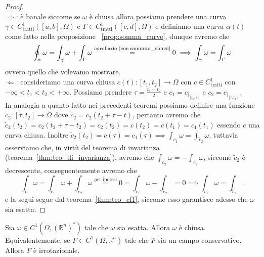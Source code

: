 \begin{proof} \hspace{1cm} \\
	$\boxed{\Rightarrow}$: è banale siccome se $\omega$ è chiusa allora possiamo prendere una curva $\gamma \in C^1_\text{tratti}([a, b], \Omega)$ e $\Gamma \in C^1_\text{tratti}([c, d], \Omega)$ e definiamo una curva $\alpha(t)$ come fatto nella proposizione
	~\ref{prop:somma_curve}, dunque avremo che
	$$
	\oint_\alpha \omega = \int_\gamma \omega + \int_{\tilde{\Gamma}} \omega \stackrel{\text{corollario~\ref{cor:cammini_chiusi}}}{=} 0 \implies \int_\gamma \omega = \int_\Gamma \omega
	$$
	ovvero quello che volevamo mostrare. \\
	$\boxed{\Leftarrow}$: consideriamo una curva chiusa $c(t): [t_1, t_2] \to \Omega$ con $c \in C^1_\text{tratti}$ con $-\infty < t_1 < t_2 < +\infty$. Possiamo prendere $\tau = \frac{t_1 + t_2}{2}$ e $c_1 = c_{|_{[t_1, \tau]}}$ e $c_2 = c_{|_{[\tau, t_2]}}$. \\
	In analogia a quanto fatto nei precedenti teoremi possiamo definire una funzione $\tilde{c}_2: [\tau, t_2] \to \Omega$ dove $\tilde{c}_2 = c_2(t_2 + \tau - t)$, pertanto avremo che $\tilde{c}_2(t_2) = c_2(t_2 + \tau - t_2) = c_2(t_2) = c(t_2) = c(t_1) = c_1(t_1)$ essendo $c$ una curva chiusa.
	Inoltre $\tilde{c}_2(t_2) = c(\tau) = c_1(\tau) \implies \int_{c_1} \omega = \int_{\tilde{c}_2} \omega$, tuttavia osserviamo che, in virtù del teorema di invarianza (teorema~\ref{thm:teo_di_invarianza}), avremo che $\int_{\tilde{c}_2} \omega = - \int_{c_2} \omega$, siccome $\tilde{c}_2$ è decrescente, conseguentemente avremo che
	$$
	\int_c \omega = \int_{c_1} \omega + \int_{c_2} \omega \stackrel{\text{per ipotesi}}{=} 0 = \int_{c_1} \omega - \int_{\tilde{c}_2} = 0 \implies \int_{c_1} \omega = \int_{\tilde{c}_2}.
	$$
	e la segui segue dal teorema~\ref{thm:teo_cf1}, siccome esso garantisce adesso che $\omega$ sia esatta.
\end{proof}
\begin{prop}
	Sia $\omega \in C^1(\Omega, (\mathbb{R}^n)^*)$ tale che $\omega$ sia esatta. Allora $\omega$ è chiusa. \\
	Equivalentemente, se $F \in C^1(\Omega, \mathbb{R}^n)$ tale che $F$ sia un campo conservativo. Allora $F$ è irrotazionale.
	\label{prop:esattezza_imp_chiusura}
\end{prop}
